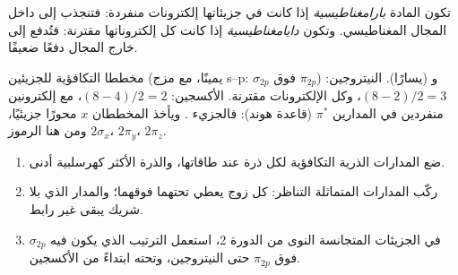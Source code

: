 \begin{definition}\label{def:b2:diatomic-mos:magnetism}
تكون المادة \emph{بارامغناطيسية} إذا كانت في جزيئاتها
إلكترونات منفردة: فتنجذب إلى داخل المجال المغناطيسي. وتكون
\emph{دايامغناطيسية} إذا كانت كل إلكتروناتها مقترنة: فتُدفع
إلى خارج المجال دفعًا ضعيفًا.
\end{definition}

\begin{omfigure}
\begin{MOdiagram}[names, labels, style=square, distance=4.2cm, labels-fs=\scriptsize]
\end{MOdiagram}
\hfill
\begin{MOdiagram}[names, labels, style=square, distance=4.2cm, labels-fs=\scriptsize]
\end{MOdiagram}

{\small مخططا  التكافؤية للجزيئين  (يمينًا، مع مزج s--p:
$\sigma_{2p}$ فوق $\pi_{2p}$) و (يسارًا). النيتروجين: 
$(8 - 2)/2 = 3$، وكل الإلكترونات مقترنة. الأكسجين:  $(8 - 4)/2 = 2$، مع إلكترونين
منفردين في المدارين $\pi^*$ (قاعدة هوند): فالجزيء 
. ويأخذ المخططان $x$ محورًا جزيئيًا، ومن هنا الرموز
$2\sigma_x$، $2\pi_y$، $2\pi_z$.}
\end{omfigure}

\begin{method}\label{met:b2:diatomic-mos:build-diagram}
\begin{enumerate}
  \item ضع المدارات الذرية التكافؤية لكل ذرة عند طاقاتها، والذرة الأكثر
        كهرسلبية أدنى.
  \item ركّب المدارات المتماثلة التناظر: كل زوج يعطي 
        تحتهما  فوقهما؛ والمدار الذي بلا شريك يبقى
        غير رابط.
  \item في الجزيئات المتجانسة النوى من الدورة 2، استعمل الترتيب الذي يكون فيه $\sigma_{2p}$ فوق
        $\pi_{2p}$ حتى النيتروجين، وتحته ابتداءً من الأكسجين.
\end{enumerate}
\end{method}

